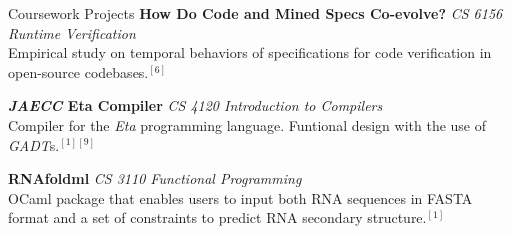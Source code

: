  
\begin{rSection}{Coursework Projects}
	\textbf{How Do Code and Mined Specs Co-evolve?} \textit{CS 6156 Runtime Verification} \\
	Empirical study on temporal behaviors of specifications for code verification in open-source codebases.$^{[6]}$ 

	\textbf{\textit{JAECC} Eta Compiler} \textit{CS 4120 Introduction to Compilers} \\
	Compiler for the \textit{Eta} programming language. Funtional design with the use of \textit{GADT}s.$^{[1][9]}$ 

	\textbf{RNAfoldml} \textit{CS 3110 Functional Programming} \href{https://github.com/jpVinnie/RNAfoldml/}{\ExternalLink} \\
	OCaml package that enables users to input both RNA sequences in FASTA format and a set of constraints to predict RNA secondary structure.$^{[1]}$

\end{rSection}